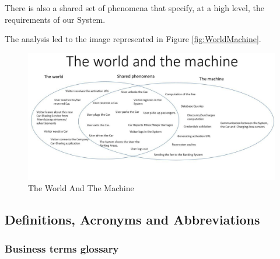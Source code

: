 There is also a shared set of phenomena that specify, at a high level, the requirements of our System.

The analysis led to the image represented in Figure \ref{fig:WorldMachine}.
\begin{figure}[!htbp]
\centering
\includegraphics[width=\linewidth,keepaspectratio]{../The_world_and_the_machine.jpg}
\caption{The World And The Machine}
\end{figure}
\label{fig:WorldMachine}
\FloatBarrier

\subsection{Definitions, Acronyms and Abbreviations}
\subsubsection{Business terms glossary}
